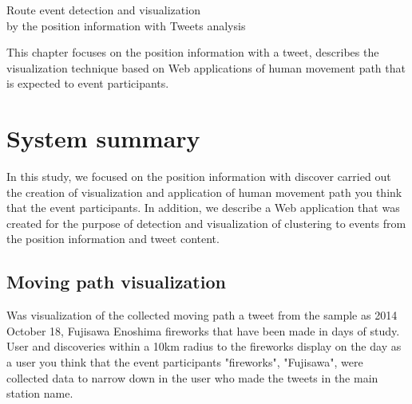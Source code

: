 \chapterhead
{Route event detection and visualization\\
by the position information with Tweets analysis}

{This chapter focuses on the position information with a tweet, describes the visualization technique based on Web applications of human movement path that is expected to event participants.}


\section{System summary}
In this study, we focused on the position information with discover carried out the creation of visualization and application of human movement path you think that the event participants.
In addition, we describe a Web application that was created for the purpose of detection and visualization of clustering to events from the position information and tweet content.

\subsection{Moving path visualization}
Was visualization of the collected moving path a tweet from the sample as 2014 October 18, Fujisawa Enoshima fireworks \cite{webpage_fujisawa} that have been made in days of study.
User and discoveries within a 10km radius to the fireworks display on the day as a user you think that the event participants "fireworks", "Fujisawa", were collected data to narrow down in the user who made the tweets in the main station name.

